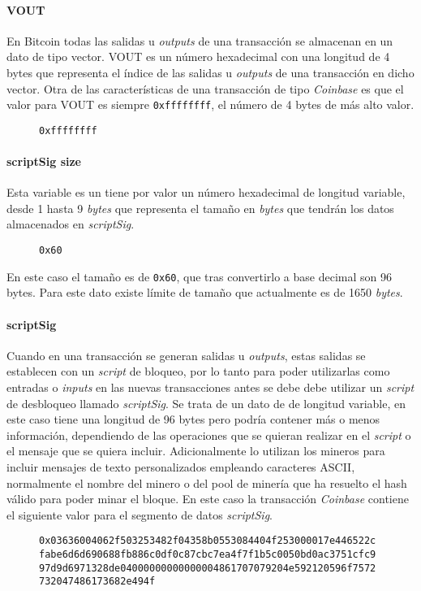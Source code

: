 \documentclass{article}
\begin{document}
    \paragraph{VOUT}
    En Bitcoin todas las salidas u \textit{outputs} de una transacción se almacenan en un dato de tipo vector. VOUT es un número hexadecimal con una longitud de 4 bytes que representa el índice de las salidas u \textit{outputs} de una transacción en dicho vector. Otra de las características de una transacción de tipo \textit{Coinbase} es que el valor para VOUT es siempre \texttt{0xffffffff}, el número de 4 bytes de más alto valor.
    \begin{figure}[H]
        \texttt{0xffffffff}
    \end{figure}
    
    \paragraph{scriptSig size}
    Esta variable es un tiene por valor un número hexadecimal de longitud variable, desde 1 hasta 9 \textit{bytes} que representa el tamaño en \textit{bytes} que tendrán los datos almacenados en \textit{scriptSig}.
    \begin{figure}[H]
        \texttt{0x60}
    \end{figure}
    En este caso el tamaño es de \texttt{0x60}, que tras convertirlo a base decimal son 96 bytes. Para este dato existe límite de tamaño que actualmente es de 1650 \textit{bytes}.
    
    \paragraph{scriptSig}
    Cuando en una transacción se generan salidas u \textit{outputs}, estas salidas se establecen con un \textit{script} de bloqueo, por lo tanto para poder utilizarlas como entradas o \textit{inputs} en las nuevas transacciones antes se debe debe utilizar un \textit{script} de desbloqueo llamado \textit{scriptSig}. Se trata de un dato de de longitud variable, en este caso tiene una longitud de 96 bytes pero podría contener más o menos información, dependiendo de las operaciones que se quieran realizar en el \textit{script} o el mensaje que se quiera incluir. Adicionalmente lo utilizan los mineros para incluir mensajes de texto personalizados empleando caracteres ASCII, normalmente el nombre del minero o del pool de minería que ha resuelto el hash válido para poder minar el bloque. En este caso la transacción \textit{Coinbase} contiene el siguiente valor para el segmento de datos \textit{scriptSig}.
    \begin{figure}[H]
        \texttt{0x03636004062f503253482f04358b0553084404f253000017e446522c} \\
        \texttt{fabe6d6d690688fb886c0df0c87cbc7ea4f7f1b5c0050bd0ac3751cfc9}
        \texttt{97d9d6971328de04000000000000004861707079204e592120596f7572}
        \texttt{732047486173682e494f}
    \end{figure}
    
\end{document}
